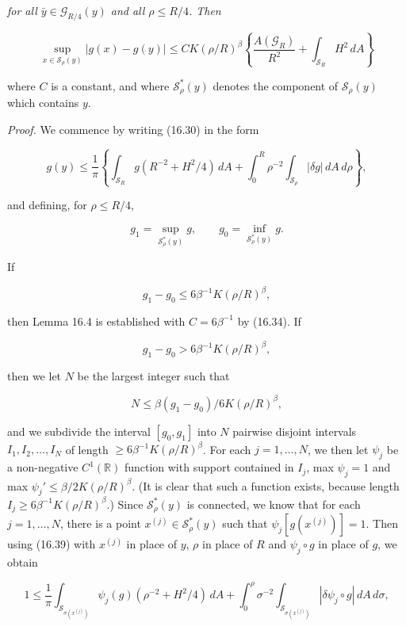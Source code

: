 \emph{for all $\bar y\in \mathcal G_{R/4}(y)$ and all $\rho\le R/4$. Then}

\begin{equation}
\sup_{x\in \mathcal S_{\rho}(y)}|g(x)-g(y)|\le CK(\rho/R)^{\beta}\left\{\frac{A(\mathcal G_{R})}{R^{2}}+\int_{\mathcal S_{R}}H^{2}\,dA\right\}
\tag{16.38}
\end{equation}


where $C$ is a constant, and where $\mathcal{S}^*_\rho(y)$ denotes the component of $\mathcal{S}_\rho(y)$ which
contains $y$.

\textit{Proof.} We commence by writing (16.30) in the form

\begin{equation}
g(y)\le \frac{1}{\pi}\left\{\int_{\mathcal{S}_R} g\left(R^{-2}+H^2/4\right)\,dA
+ \int_0^R \rho^{-2}\int_{\mathcal{S}_\rho} |\delta g|\,dA\,d\rho\right\},
\tag{16.39}
\end{equation}

and defining, for $\rho\leq R/4$,

\[
g_1=\sup_{\mathcal{S}^*_\rho(y)} g,\qquad g_0=\inf_{\mathcal{S}^*_\rho(y)} g.
\]

If

\[
g_1-g_0\le 6\beta^{-1}K(\rho/R)^\beta,
\]

then Lemma 16.4 is established with $C=6\beta^{-1}$ by (16.34). If

\[
g_1-g_0>6\beta^{-1}K(\rho/R)^\beta,
\]

then we let $N$ be the largest integer such that

\[
N\le \beta(g_1-g_0)/6K(\rho/R)^\beta,
\]

and we subdivide the interval $[g_0,g_1]$ into $N$ pairwise disjoint intervals $I_1,I_2,\ldots,I_N$
of length $\ge 6\beta^{-1}K(\rho/R)^\beta$. For each $j=1,\ldots,N$, we then let $\psi_j$ be a non-negative
$C^1(\mathbb{R})$ function with support contained in $I_j$, max $\psi_j=1$ and max $\psi_j'\le \beta/2K(\rho/R)^\beta$.
(It is clear that such a function exists, because length $I_j\ge 6\beta^{-1}K(\rho/R)^\beta$.) Since $\mathcal{S}^*_\rho(y)$
is connected, we know that for each $j=1,\ldots,N$, there is a point $x^{(j)}\in \mathcal{S}^*_\rho(y)$ such
that $\psi_j[g(x^{(j)})]=1$. Then using (16.39) with $x^{(j)}$ in place of $y$, $\rho$ in place of $R$ and
$\psi_j\circ g$ in place of $g$, we obtain

\[
1\le \frac{1}{\pi}\int_{\mathcal{S}_{\sigma(x^{(j)})}} \psi_j(g)\left(\rho^{-2}+H^2/4\right)\,dA
+ \int_0^\rho \sigma^{-2}\int_{\mathcal{S}_{\sigma(x^{(j)})}} |\delta\psi_j\circ g|\,dA\,d\sigma,
\]

